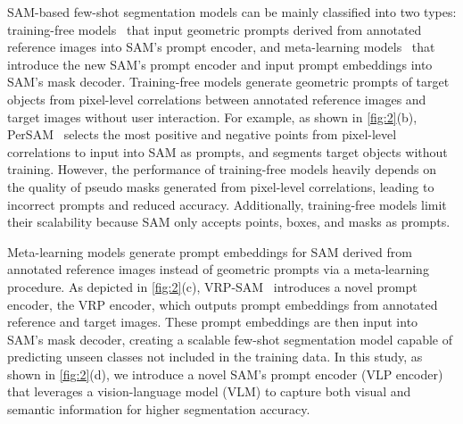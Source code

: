 SAM-based few-shot segmentation models can be mainly classified into two types: training-free models~\cite{PerSAM, Mather, PDM, NubbleDrop, PMC} that input geometric prompts derived from annotated reference images into SAM's prompt encoder, and meta-learning models~\cite{VRP-SAM, APSeg, Foreground-Covering} that introduce the new SAM's prompt encoder and input prompt embeddings into SAM's mask decoder. Training-free models generate geometric prompts of target objects from pixel-level correlations between annotated reference images and target images without user interaction. For example, as shown in \cref{fig:2}(b), PerSAM~\cite{PerSAM} selects the most positive and negative points from pixel-level correlations to input into SAM as prompts, and segments target objects without training. However, the performance of training-free models heavily depends on the quality of pseudo masks generated from pixel-level correlations, leading to incorrect prompts and reduced accuracy. Additionally, training-free models limit their scalability because SAM only accepts points, boxes, and masks as prompts.

Meta-learning models generate prompt embeddings for SAM derived from annotated reference images instead of geometric prompts via a meta-learning procedure. As depicted in \cref{fig:2}(c), VRP-SAM~\cite{VRP-SAM} introduces a novel prompt encoder, the VRP encoder, which outputs prompt embeddings from annotated reference and target images. These prompt embeddings are then input into SAM's mask decoder, creating a scalable few-shot segmentation model capable of predicting unseen classes not included in the training data. In this study, as shown in \cref{fig:2}(d), we introduce a novel SAM's prompt encoder (VLP encoder) that leverages a vision-language model (VLM) to capture both visual and semantic information for higher segmentation accuracy.

